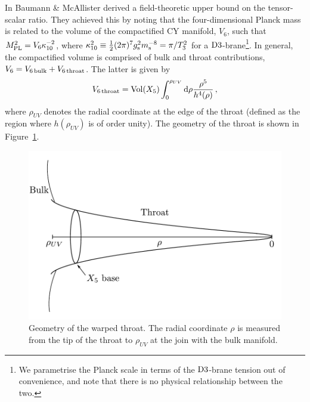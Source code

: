 In  Baumann \& McAllister
derived a field-theoretic upper bound on the tensor-scalar ratio. They achieved
this by noting that the four-dimensional Planck mass is related 
to the volume of the compactified CY manifold, $V_6$, such that 
$M_{\mathrm{PL}}^2=V_6 \kappa_{10}^{-2}$, where $\kappa_{10}^2 \equiv 
\frac{1}{2} (2\pi )^7 g_\mathrm{s}^2 m_\mathrm{s}^{-8} = \pi /T_3^{2}$ for a 
${\rm D3}$-brane\footnote{We parametrise the Planck scale 
in terms of the ${\rm D3}$-brane tension out of convenience, 
and note that there is no physical relationship between the two.}.
In general, the compactified volume 
is comprised of bulk and throat contributions, 
$V_6 = V_{6\,{\rm bulk}}+V_{6\,{\rm throat}}$. The latter is 
given by
% 
\begin{equation}
\label{eq:throatvolume}
V_{6\,\mathrm{throat}} = \mathrm{Vol}(X_5)  
\int_0^{\rho_{UV}} \mathrm{d}\rho \frac{\rho^5}{h^4(\rho )} \,,
\end{equation}
% 
where $\rho_{UV}$ denotes the radial coordinate at 
the edge of the throat (defined as the region 
where $h (\rho_{UV})$ is of order unity). The geometry of the throat is shown
in Figure~\ref{fig:throat-geom}.

% 
\begin{figure}[htbp]
 \centering
 \includegraphics[width=\textwidth]{./dbi/graphs/throat-geom.pdf}
 \caption[Warped Throat Geometry]{Geometry of the warped throat. The radial
coordinate $\rho$ is measured from the tip of the throat to $\rho_{UV}$ at the join
with the bulk manifold.}
 \label{fig:throat-geom}
\end{figure}

% 

